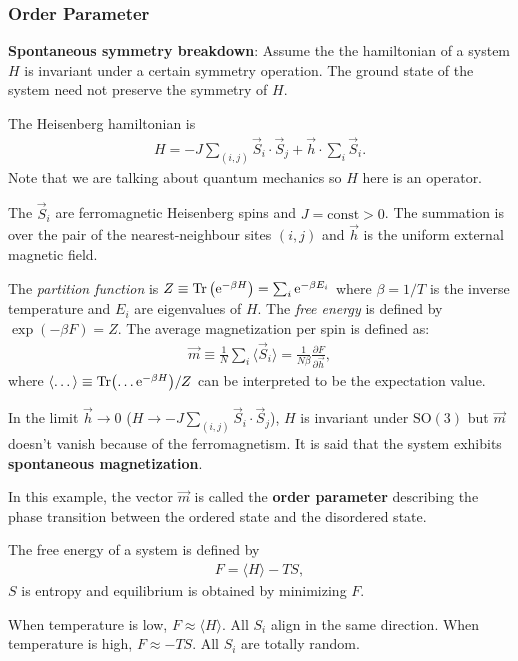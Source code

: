 \documentclass[10pt]{article}
\begin{document}
\subsubsection{Order Parameter}
\textbf{Spontaneous symmetry breakdown}: Assume the the hamiltonian of a system $H$ is invariant under a certain symmetry operation.
The ground state of the system need not preserve the symmetry of $H$.
\begin{example}
    The Heisenberg hamiltonian is
    \begin{align}
        H=-J\sum_{(i,j)}\vec{S}_i\cdot\vec{S}_j+\vec{h}\cdot\sum_i \vec{S}_i.
    \end{align}
    Note that we are talking about quantum mechanics so $H$ here is an operator.

    The $\vec{S}_i$ are ferromagnetic Heisenberg spins and $J=\text{const}>0$.
    The summation is over the pair of the nearest-neighbour sites $(i,j)$ and $\vec{h}$ is the uniform external magnetic field.

    The \textit{partition function} is $Z\equiv\Tr\left(\text{e}^{-\beta H}\right)=\sum_i \mathrm{e}^{-\beta E_i}$ where $\beta=1/T$ is the inverse temperature and $E_i$ are eigenvalues of $H$.
    The \textit{free energy} is defined by $\exp(-\beta F)=Z$.
    The average magnetization per spin is defined as:
    \begin{align}
        \vec{m}\equiv\frac{1}{N}\sum_{i}\langle\vec{S}_i\rangle=\frac{1}{N\beta}\frac{\partial F}{\partial \vec{h}},
    \end{align}
    where $\langle\dots\rangle\equiv\Tr(\dots \text{e}^{-\beta H})/Z$ can be interpreted to be the expectation value.

    In the limit $\vec{h}\rightarrow 0$ ($H\rightarrow -J\sum_{(i,j)}\vec{S}_i\cdot\vec{S}_j$), $H$ is invariant under $\text{SO}(3)$ but $\vec{m}$ doesn't vanish because of the ferromagnetism.
    It is said that the system exhibits \textbf{spontaneous magnetization}.

    In this example, the vector $\vec{m}$ is called the \textbf{order parameter} describing the phase transition between the ordered state and the disordered state.
\end{example}
The free energy of a system is defined by
\begin{align}
    F=\langle H\rangle-TS,
\end{align}
$S$ is entropy and equilibrium is obtained by minimizing $F$.

When temperature is low, $F\approx\langle H\rangle$.
All $S_i$ align in the same direction.
When temperature is high, $F\approx-TS$.
All $S_i$ are totally random.
\end{document}
